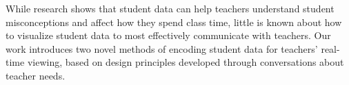 \documentclass{sigchi}
\begin{document}
While research shows that student data can help teachers understand student misconceptions and affect how they spend class time, little is known about how to visualize student data to most effectively communicate with teachers. Our work introduces two novel methods of encoding student data for teachers' real-time viewing, based on design principles developed through conversations about teacher needs. 

\end{document}
